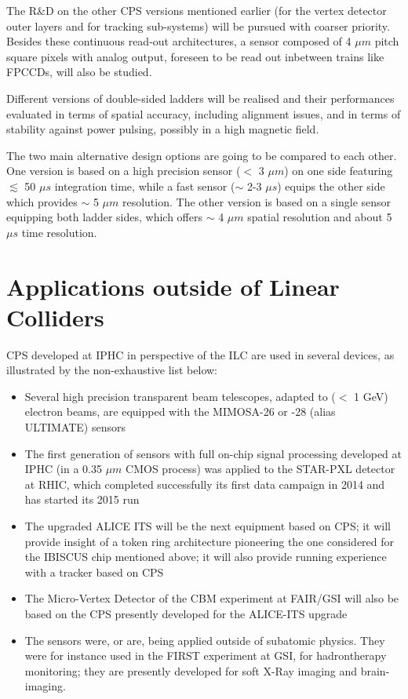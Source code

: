 \documentclass[11pt,a4paper,twosided]{article}
\begin{document}
  The R\&D on the other CPS versions mentioned earlier (for the vertex 
detector outer layers and for tracking sub-systems) will be pursued 
with coarser priority. 
Besides these continuous read-out architectures, a sensor composed 
of 4 $\mu m$ pitch square pixels with analog output, foreseen to be 
read out inbetween trains like FPCCDs, will also be studied.        


  Different versions of double-sided ladders will be realised and 
their performances evaluated in terms of spatial accuracy, including 
alignment issues, and in terms of stability against power pulsing, 
possibly in a high magnetic field. 

  The two main alternative design options are going to be compared 
to each other. One version is based on a high precision sensor 
($<$ 3 $\mu m$) on one side featuring $\lesssim$ 50 $\mu s$ integration 
time, while a fast sensor ($\sim$ 2-3 $\mu s$) equips the other side
which provides $\sim$ 5 $\mu m$ resolution. The other version is based 
on a single sensor equipping both ladder sides, which offers $\sim$ 
4 $\mu m$ spatial resolution and about 5 $\mu s$ time resolution.
  

\section{Applications outside of Linear Colliders}

  CPS developed at IPHC in perspective of the ILC are used in several   
devices, as illustrated by the non-exhaustive list below:
\begin{itemize}
\item Several high precision transparent beam telescopes, adapted to 
      ($<$ 1 GeV) electron beams, are equipped with the MIMOSA-26 or 
      -28 (alias ULTIMATE) sensors
\item The first generation of sensors with full on-chip signal processing    
      developed at IPHC (in a 0.35 $\mu m$ CMOS process) was applied to the 
      STAR-PXL detector at RHIC, which completed successfully its first 
      data campaign in 2014 and has started its 2015 run
\item The upgraded ALICE ITS will be the next equipment based on CPS;
      it will provide insight of a token ring architecture pioneering
      the one considered for the IBISCUS chip mentioned above; it will 
      also provide running experience with a tracker based on CPS 
\item The Micro-Vertex Detector of the CBM experiment at FAIR/GSI will
      also be based on the CPS presently developed for the ALICE-ITS
      upgrade
\item The sensors were, or are, being applied outside of subatomic physics. 
      They were for instance used in the FIRST experiment at GSI, for    
      hadrontherapy monitoring; they are presently developed for soft 
      X-Ray imaging and brain-imaging.    
\end{itemize}
\end{document}
